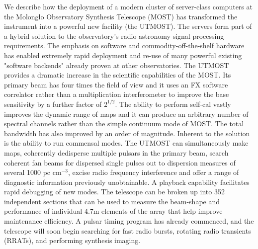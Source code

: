 We describe how the deployment of a modern cluster of server-class computers at the Molonglo Observatory Synthesis Telescope (MOST) has transformed the instrument into a powerful new facility (the UTMOST). The servers form part of a hybrid solution to the observatory's radio astronomy signal processing requirements. The emphasis on software and commodity-off-the-shelf hardware has enabled extremely rapid deployment and re-use of many powerful existing "software backends" already proven at other observatories. The UTMOST provides a dramatic increase in the scientific capabilities of the MOST. Its primary beam has four times the field of view and it uses an FX software correlator rather than a multiplication interferometer to improve the base sensitivity by a further factor of $2^{1/2}$. The ability to perform self-cal vastly improves the dynamic range of maps and it can produce an arbitrary number of spectral channels rather than the simple continuum mode of MOST. The total bandwidth has also improved by an order of magnitude. Inherent to the solution is the ability to run commensal modes. The UTMOST can simultaneously make maps, coherently dedisperse multiple pulsars in the primary beam, search coherent fan beams for dispersed single pulses out to dispersion measures of several 1000 pc cm$^{-3}$, excise radio frequency interference and offer a range of diagnostic information previously unobtainable. A playback capability facilitates rapid debugging of new modes. The telescope can be broken up into 352 independent sections that can be used to measure the beam-shape and performance of individual 4.7m elements of the array that help improve maintenance efficiency. A pulsar timing program has already commenced, and the telescope will soon begin searching for fast radio bursts, rotating radio transients (RRATs), and performing synthesis imaging. 
